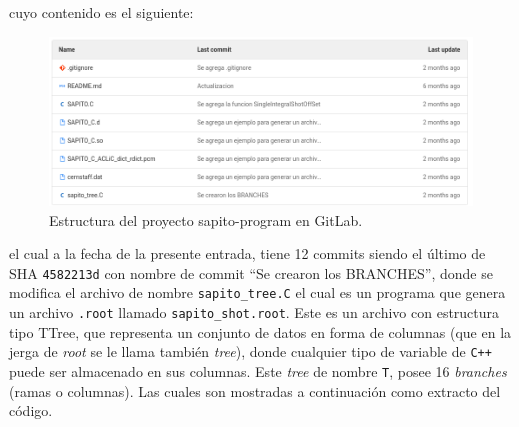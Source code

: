 \documentclass[11pt,letterpaper]{article}
\begin{document}
cuyo contenido es el siguiente:

\begin{figure}[H]
    \includegraphics[width=1\textwidth]{img/Screenshot from 2021-11-22 17-40-51.png}
    \centering
    \caption{Estructura del proyecto sapito-program en GitLab.}
\end{figure}



el cual a la fecha de la presente entrada, tiene 12 commits siendo el último de SHA \verb|4582213d| con nombre de commit ``Se crearon los BRANCHES'', donde se modifica el archivo de nombre \verb|sapito_tree.C| el cual es un programa que genera un archivo \verb|.root| llamado \verb|sapito_shot.root|. Este es un archivo con estructura tipo TTree, que representa un conjunto de datos en forma de columnas (que en la jerga de \textit{root} se le llama también \textit{tree}), donde cualquier tipo de variable de \verb|C++| puede ser almacenado en sus columnas. Este \textit{tree} de nombre \verb|T|, posee 16 \textit{branches} (ramas o columnas). Las cuales son mostradas a continuación como extracto del código.
\end{document}
